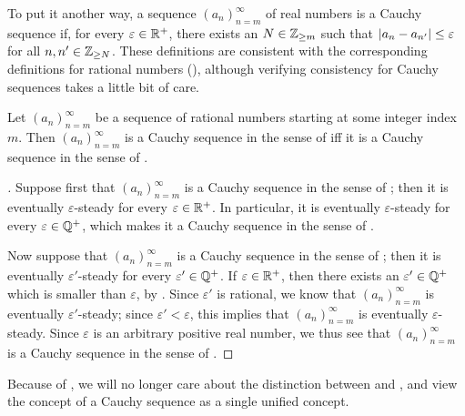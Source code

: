 \begin{note}
  To put it another way, a sequence \((a_n)_{n = m}^\infty\) of real numbers is a Cauchy sequence if, for every \(\varepsilon \in \mathbb{R}^+\), there exists an \(N \in \mathbb{Z}_{\geq m}\) such that \(\left\lvert a_n - a_{n'}\right\rvert \leq \varepsilon\) for all \(n, n' \in \mathbb{Z}_{\geq N}\).
  These definitions are consistent with the corresponding definitions for rational numbers (), although verifying consistency for Cauchy sequences takes a little bit of care.
\end{note}

\begin{prop}\label{i:6.1.4}
  Let \((a_n)_{n = m}^\infty\) be a sequence of rational numbers starting at some integer index \(m\).
  Then \((a_n)_{n = m}^\infty\) is a Cauchy sequence in the sense of  iff it is a Cauchy sequence in the sense of .
\end{prop}

\begin{proof}[]
  Suppose first that \((a_n)_{n = m}^\infty\) is a Cauchy sequence in the sense of ;
  then it is eventually \(\varepsilon\)-steady for every \(\varepsilon \in \mathbb{R}^+\).
  In particular, it is eventually \(\varepsilon\)-steady for every \(\varepsilon \in \mathbb{Q}^+\), which makes it a Cauchy sequence in the sense of .

  Now suppose that \((a_n)_{n = m}^\infty\) is a Cauchy sequence in the sense of ;
  then it is eventually \(\varepsilon'\)-steady for every \(\varepsilon' \in \mathbb{Q}^+\).
  If \(\varepsilon \in \mathbb{R}^+\), then there exists an \(\varepsilon' \in \mathbb{Q}^+\) which is smaller than \(\varepsilon\), by .
  Since \(\varepsilon'\) is rational, we know that \((a_n)_{n = m}^\infty\) is eventually \(\varepsilon'\)-steady;
  since \(\varepsilon' < \varepsilon\), this implies that \((a_n)_{n = m}^\infty\) is eventually \(\varepsilon\)-steady.
  Since \(\varepsilon\) is an arbitrary positive real number, we thus see that \((a_n)_{n = m}^\infty\) is a Cauchy sequence in the sense of .
\end{proof}

\begin{note}
  Because of , we will no longer care about the distinction between  and , and view the concept of a Cauchy sequence as a single unified concept.
\end{note}

